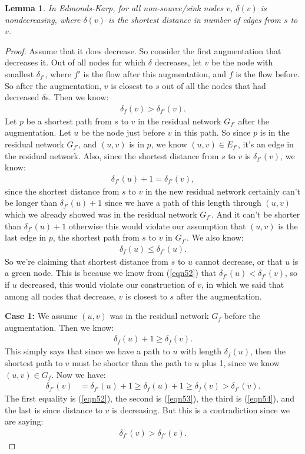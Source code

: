 \documentclass[reqno]{amsbook}
\theoremstyle{plain}
\numberwithin{section}{chapter}
\numberwithin{equation}{chapter}
\newtheorem{lem}[theorem]{Lemma}
\theoremstyle{definition}
\theoremstyle{remark}
\newcommand{\bee}{\begin{equation}\begin{aligned}}
\newcommand{\eee}{\end{aligned}\end{equation}}
\begin{document}
\begin{lem} \label{lem6}
In Edmonds-Karp, for all non-source/sink nodes $v$, $\delta(v)$ is nondecreasing, where $\delta(v)$ is the shortest distance in number of edges from $s$ to $v$.
\end{lem}

\begin{proof}
Assume that it does decrease. So consider the first augmentation that decreases it. Out of all nodes for which $\delta$ decreases, let $v$ be the node with smallest $\delta_{f'}$, where $f'$ is the flow after this augmentation, and $f$ is the flow before. So after the augmentation, $v$ is closest to $s$ out of all the nodes that had decreased $\delta$s. Then we know:
\bee
\delta_f(v) > \delta_{f'}(v).
\eee
Let $p$ be a shortest path from $s$ to $v$ in the residual network $G_{f'}$ after the augmentation. Let $u$ be the node just before $v$ in this path. So since $p$ is in the residual network $G_{f'}$, and $(u,v)$ is in $p$, we know $(u,v) \in E_{f'}$, it's an edge in the residual network. Also, since the shortest distance from $s$ to $v$ is $\delta_{f'}(v)$, we know:
\bee\label{eqn52}
\delta_{f'}(u) + 1 = \delta_{f'}(v),
\eee
since the shortest distance from $s$ to $v$ in the new residual network certainly can't be longer than $\delta_{f'}(u) + 1$ since we have a path of this length through $(u,v)$ which we already showed was in the residual network $G_{f'}$. And it can't be shorter than $\delta_{f'}(u) + 1$ otherwise this would violate our assumption that $(u,v)$ is the last edge in $p$, the shortest path from $s$ to $v$ in $G_{f'}$. We also know:
\bee\label{eqn53}
\delta_f(u) \leq \delta_{f'}(u).
\eee
So we're claiming that shortest distance from $s$ to $u$ cannot decrease, or that $u$ is a green node. This is because we know from (\ref{eqn52}) that $\delta_{f'}(u) < \delta_{f'}(v)$, so if $u$ decreased, this would violate our construction of $v$, in which we said that among all nodes that decrease, $v$ is closest to $s$ after the augmentation. 

\textbf{Case 1: }We assume $(u,v)$ was in the residual network $G_f$ before the augmentation. Then we know:
\bee\label{eqn54}
\delta_{f}(u) + 1 \geq \delta_{f}(v). 
\eee
This simply says that since we have a path to $u$ with length $\delta_f(u)$, then the shortest path to $v$ must be shorter than the path to $u$ plus 1, since we know $(u,v) \in G_f$. Now we have:
\bee
\delta_{f'}(v) &= \delta_{f'}(u) + 1 \geq \delta_{f}(u) + 1 \geq \delta_f(v) > \delta_{f'}(v).
\eee
The first equality is (\ref{eqn52}), the second is (\ref{eqn53}), the third is (\ref{eqn54}), and the last is since distance to $v$ is decreasing. But this is a contradiction since we are saying:
\bee
\delta_{f'}(v) > \delta_{f'}(v).
\eee


\end{proof}
\end{document}
